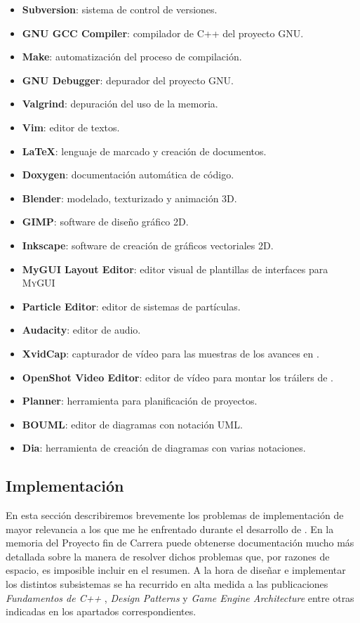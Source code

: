 \documentclass[a4paper,11pt]{article}
\begin{document}
\begin{itemize}
    \item \textbf{Subversion}: sistema de control de versiones.
    \item \textbf{GNU GCC Compiler}: compilador de C++ del proyecto GNU.
    \item \textbf{Make}: automatización del proceso de compilación.
    \item \textbf{GNU Debugger}: depurador del proyecto GNU.
    \item \textbf{Valgrind}: depuración del uso de la memoria.
    \item \textbf{Vim}: editor de textos.
    \item \textbf{\LaTeX}: lenguaje de marcado y creación de documentos.
    \item \textbf{Doxygen}: documentación automática de código.
    \item \textbf{Blender}: modelado, texturizado y animación 3D.
    \item \textbf{GIMP}: software de diseño gráfico 2D.
    \item \textbf{Inkscape}: software de creación de gráficos vectoriales 2D.
    \item \textbf{MyGUI Layout Editor}: editor visual de plantillas de interfaces para \textsc{MyGUI}
    \item \textbf{Particle Editor}: editor de sistemas de partículas.
    \item \textbf{Audacity}: editor de audio.
    \item \textbf{XvidCap}: capturador de vídeo para las muestras de los avances en \juego.
    \item \textbf{OpenShot Video Editor}: editor de vídeo para montar los
    tráilers de \juego.
    \item \textbf{Planner}: herramienta para planificación de proyectos.
    \item \textbf{BOUML}: editor de diagramas con notación UML.
    \item \textbf{Dia}: herramienta de creación de diagramas con varias notaciones.\\
\end{itemize}

\subsection{Implementación}

\noindent En esta sección describiremos brevemente los problemas de implementación
de mayor relevancia a los que me he enfrentado durante el desarrollo de \juego. En la memoria
del Proyecto fin de Carrera puede obtenerse documentación mucho más detallada
sobre la manera de resolver dichos problemas que, por razones de espacio,
es imposible incluir en el resumen. A la hora de diseñar e implementar
los distintos subsistemas se ha recurrido en alta medida a las publicaciones
\textit{Fundamentos de C++} \cite{gera09},
\textit{Design Patterns} \cite{gamm77} y \textit{Game Engine Architecture}
\cite{greg09} entre otras indicadas en los apartados correspondientes.\\
\end{document}
